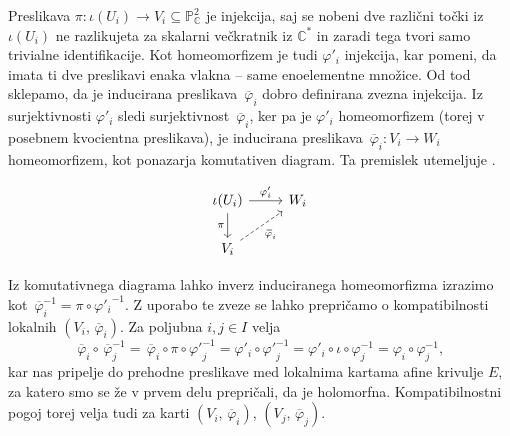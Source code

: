 \documentclass[mat1]{fmfdelo}
\numberwithin{equation}{section}
\newcommand{\C}{\mathbb C}
\newcommand{\CM}{\mathbb C ^*}
\newcommand{\PC}{\mathbb{P}^2_\C}
\newcommand{\inv}{^{-1}}
\newcommand{\olsi}[1]{\,\overline{\!{#1}}} %
\theoremstyle{definition}
\begin{document}
Preslikava $\pi: \iota(U_i) \to V_i \subseteq \PC$ je injekcija, saj se nobeni dve različni točki iz $\iota(U_i)$ ne razlikujeta za skalarni večkratnik iz $\CM$ in zaradi tega tvori samo trivialne identifikacije. Kot homeomorfizem je tudi $\varphi'_i$ injekcija, kar pomeni, da imata ti dve preslikavi enaka vlakna -- same enoelementne množice. Od tod sklepamo, da je inducirana preslikava $\olsi{\varphi}_i$ dobro definirana zvezna injekcija. Iz surjektivnosti $\varphi'_i$ sledi surjektivnost $\olsi{\varphi}_i$, ker pa je $\varphi'_i$ homeomorfizem (torej v posebnem kvocientna preslikava), je inducirana preslikava $\olsi{\varphi}_i : V_i \to W_i$ homeomorfizem, kot ponazarja komutativen diagram. Ta premislek utemeljuje \cite[posledica 3.23]{MrcunTop}.

\begin{equation}
    \label{projektivna karta diagram}    
    \begin{tikzcd}
        \iota(U_i) \arrow{r}{\varphi'_i} \ar[labels=left]{d}{\pi} & W_i \\
        V_i \ar[dashed, labels=below right]{ur}{\olsi{\varphi}_i} 
    \end{tikzcd}
\end{equation}    


Iz komutativnega diagrama lahko inverz induciranega homeomorfizma izrazimo kot $\olsi{\varphi}_i\inv = \pi \circ {\varphi'_i}\inv$. Z uporabo te zveze se lahko prepričamo o kompatibilnosti lokalnih
$(V_i, \olsi{\varphi}_i)$.
Za poljubna $i,j \in I$ velja
\[
    \olsi{\varphi}_i \circ \olsi{\varphi}_j\inv = 
    \olsi{\varphi}_i \circ \pi \circ {\varphi'}_j\inv = 
    \varphi'_i \circ {\varphi'}_j\inv = 
    \varphi'_i \circ \iota \circ \varphi_j\inv = 
    \varphi_i \circ \varphi_j\inv,
\]
kar nas pripelje do prehodne preslikave med lokalnima kartama afine krivulje $E$, za katero smo se že v prvem delu prepričali, da je holomorfna. Kompatibilnostni pogoj torej velja tudi za karti $(V_i, \olsi{\varphi}_i)$, $(V_j, \olsi{\varphi}_j)$.
\end{document}

